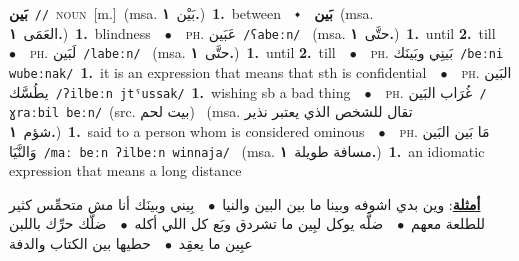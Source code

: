 \documentclass[10pt,a4paper,twoside]{article} %
\begin{document}
\begin{multicols}{2}
{\setlength\topsep{0pt}\textbf{\foreignlanguage{arabic}{بَين}}\ {\color{gray}\texttt{//}\color{black}}\ \textsc{noun}\ [m.]\ \color{gray}(msa. \foreignlanguage{arabic}{بَيْن}~\foreignlanguage{arabic}{\textbf{١.}})\color{black}\ \textbf{1.}~between\ \ $\smblkdiamond$\ \ \setlength\topsep{0pt}\textbf{\foreignlanguage{arabic}{بَين}}\ \color{gray}(msa. \foreignlanguage{arabic}{العَمَى}~\foreignlanguage{arabic}{\textbf{١.}})\color{black}\ \textbf{1.}~blindness\ \ $\bullet$\ \ \textsc{ph.} \color{gray} \foreignlanguage{arabic}{عَبَين}\color{black}\ {\color{gray}\texttt{/{\sffamily ʕabeːn}/}\color{black}}\ \color{gray} (msa. \foreignlanguage{arabic}{حتَّى}~\foreignlanguage{arabic}{\textbf{١.}})\color{black}\ \textbf{1.}~until  \textbf{2.}~till\ \ $\bullet$\ \ \textsc{ph.} \color{gray} \foreignlanguage{arabic}{لَبَين}\color{black}\ {\color{gray}\texttt{/{\sffamily labeːn}/}\color{black}}\ \color{gray} (msa. \foreignlanguage{arabic}{حتَّى}~\foreignlanguage{arabic}{\textbf{١.}})\color{black}\ \textbf{1.}~until  \textbf{2.}~till\ \ $\bullet$\ \ \textsc{ph.} \color{gray} \foreignlanguage{arabic}{بَينِي وبَينَك}\color{black}\ {\color{gray}\texttt{/{\sffamily beːni wubeːnak}/}\color{black}}\ \textbf{1.}~it is an expression that means that sth is confidential\ \ $\bullet$\ \ \textsc{ph.} \color{gray} \foreignlanguage{arabic}{البَين يطُسَّك}\color{black}\ {\color{gray}\texttt{/{\sffamily ʔilbeːn jtˤussak}/}\color{black}}\ \textbf{1.}~wishing sb a bad thing\ \ $\bullet$\ \ \textsc{ph.} \color{gray} \foreignlanguage{arabic}{غُرَاب البَين}\color{black}\ {\color{gray}\texttt{/{\sffamily ɣraːbil beːn}/}\color{black}}\ \color{gray}(src. \foreignlanguage{arabic}{بيت لحم})\color{black}\ \color{gray} (msa. \foreignlanguage{arabic}{تقال للشخص الذي يعتبر نذير شؤم}~\foreignlanguage{arabic}{\textbf{١.}})\color{black}\ \textbf{1.}~said to a person whom is considered ominous\ \ $\bullet$\ \ \textsc{ph.} \color{gray} \foreignlanguage{arabic}{مَا بَين البَين وَالنَّيَا}\color{black}\ {\color{gray}\texttt{/{\sffamily maː beːn ʔilbeːn winnaja}/}\color{black}}\ \color{gray} (msa. \foreignlanguage{arabic}{مسافة طويلة}~\foreignlanguage{arabic}{\textbf{١.}})\color{black}\ \textbf{1.}~an idiomatic expression that means a long distance\  \begin{flushright}\color{gray}\foreignlanguage{arabic}{\textbf{\underline{\foreignlanguage{arabic}{أمثلة}}}: وين بدي اشوفه وبينا ما بين البين والنيا\ $\bullet$\ \  بِيني وبينَك أنا مش متحمِّس كثير للطلعة معهم\ $\bullet$\ \  ضلَّه يوكل لبِين ما تشردق وبَع كل اللي أكله\ $\bullet$\ \  ضلَّك حرِّك باللبن عبِين ما يعقِد\ $\bullet$\ \  حطيها بين الكتاب والدفة}\end{flushright}\color{black}} \vspace{2mm}


\end{multicols}
\end{document}
